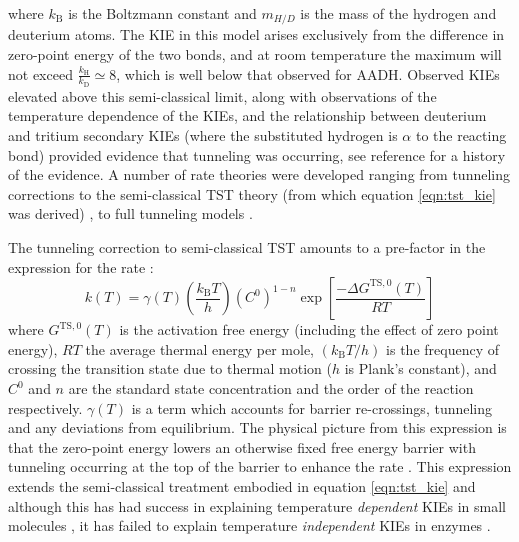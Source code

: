 where $k_{\mathrm{B}}$ is the Boltzmann constant and $m_{H/D}$ is the mass of the hydrogen and deuterium atoms. The KIE in this model arises exclusively from the difference in zero-point energy of the two bonds, and at room temperature the maximum will not exceed $\frac{k_{\mathrm{H}}}{k_{\mathrm{D}}} \simeq 8$,  which is well below that observed for AADH. Observed KIEs elevated above this semi-classical limit, along with observations of the temperature dependence of the KIEs, and the relationship between deuterium and tritium secondary KIEs (where the substituted hydrogen is $\alpha$ to the reacting bond) provided evidence that tunneling was occurring, see reference \cite{klinmanbeyond2009} for a history of the evidence. A number of rate theories were developed ranging from tunneling corrections to the semi-classical TST theory (from which equation \ref{eqn:tst_kie} was derived) \cite{bellTunnelEffectChemistry1980}, to full tunneling models \cite{antoniouLargeKineticIsotope1997, antoniouInternalEnzymeMotions2001, knappTemperatureDependentIsotopeEffects2002}. 

The tunneling correction to semi-classical TST amounts to a pre-factor in the expression for the rate \cite{garciavilocaHowEnzymesWork2004}: 
\begin{equation}\label{eqn:tst}
k(T) =\gamma(T)\left(\frac{k_{\mathrm{B}} T}{h}\right)\left(C^{0}\right)^{1-n}\exp \left[\frac{-\Delta G^{\mathrm{TS}, 0}(T)}{R T}\right]
\end{equation}
where $G^{\mathrm{TS}, 0}(T)$ is the activation free energy (including the effect of zero point energy), $RT$ the average thermal energy per mole, $\left(k_{\mathrm{B}} T / h\right)$ is the frequency of crossing the transition state due to thermal motion ($h$ is Plank's constant), and $C^{0}$ and $n$ are the standard state concentration and the order of the reaction respectively. $\gamma(T)$ is a term which accounts for barrier re-crossings, tunneling and any deviations from equilibrium. The physical picture from this expression is that the zero-point energy lowers an otherwise fixed free energy barrier with tunneling occurring at the top of the barrier to enhance the rate \cite{garciavilocaHowEnzymesWork2004}. This expression extends the semi-classical treatment embodied in equation \ref{eqn:tst_kie} and although this has had success in explaining temperature \emph{dependent} KIEs in small molecules \cite{bellTunnelEffectChemistry1980}, it has failed to explain temperature \emph{independent} KIEs in enzymes \cite{klinmanHydrogenTunnelingLinks2013}. 

